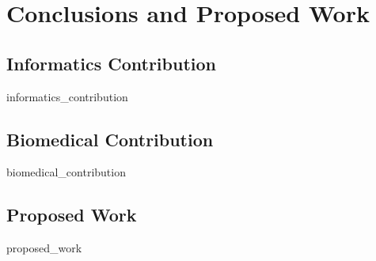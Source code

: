 \chapter{Conclusions and Proposed Work}

\section{Informatics Contribution}
{informatics_contribution}
\clearpage

\section{Biomedical Contribution}
{biomedical_contribution}
\clearpage

\section{Proposed Work}
{proposed_work}